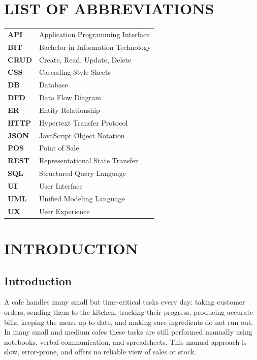\documentclass[12pt,a4paper]{report}
\begin{document}
\chapter*{LIST OF ABBREVIATIONS}
\thispagestyle{plain}
\begin{flushleft}
\setlength{\tabcolsep}{12pt}
\begin{tabular}{@{}l l@{}}
\textbf{API}  & Application Programming Interface \\
\textbf{BIT}  & Bachelor in Information Technology \\
\textbf{CRUD} & Create, Read, Update, Delete \\
\textbf{CSS}  & Cascading Style Sheets \\
\textbf{DB}   & Database \\
\textbf{DFD}  & Data Flow Diagram \\
\textbf{ER}   & Entity Relationship \\
\textbf{HTTP} & Hypertext Transfer Protocol \\
\textbf{JSON} & JavaScript Object Notation \\
\textbf{POS}  & Point of Sale \\
\textbf{REST} & Representational State Transfer \\
\textbf{SQL}  & Structured Query Language \\
\textbf{UI}   & User Interface \\
\textbf{UML}  & Unified Modeling Language \\
\textbf{UX}   & User Experience \\
\end{tabular}
\end{flushleft}

\clearpage
{}
\setcounter{page}{1}

\chapter{INTRODUCTION}

\section{Introduction}
A cafe handles many small but time-critical tasks every day: taking customer orders, sending
them to the kitchen, tracking their progress, producing accurate bills, keeping the menu up to
date, and making sure ingredients do not run out. In many small and medium cafes these tasks
are still performed manually using notebooks, verbal communication, and spreadsheets. This
manual approach is slow, error-prone, and offers no reliable view of sales or stock.
\end{document}
